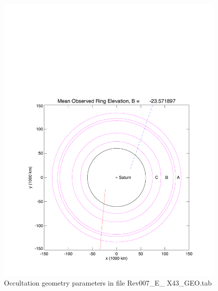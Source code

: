 \documentclass[crop=false,class=book]{standalone}
\begin{document}
\begin{figure}[H]
	    \centering
        \includegraphics[page=2,trim = {0.8in 0.5in 0.21in 0.45in},clip,width=\textwidth]{Rev007_E_X43_summary_p1_08FEB2018.pdf}
	        \caption[Occultation Geometry]{Occultation geometry parameters in file Rev007\_E\_ X43\_GEO.tab}
	        \label{fig:easy_dqata_fig_occultation_geo_parameters_inf_file_rev007_E_X43_geo_tab}
\end{figure}
\end{document}
